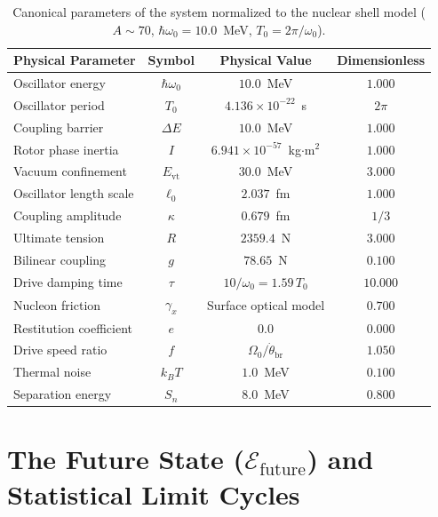 \documentclass[aps,prc,twocolumn,superscriptaddress,amsmath,amssymb,nofootinbib]{revtex4-2}
\begin{document}
\begin{table}[t]
\caption{\label{tab:params}Canonical parameters of the system normalized to the nuclear shell model (\(A \sim 70\), \(\hbar\omega_0 = 10.0\)~MeV, \(T_0 = 2\pi/\omega_0\)).}
\begin{ruledtabular}
\begin{tabular}{lccc}
Physical Parameter & Symbol & Physical Value & Dimensionless \\
\hline
Oscillator energy & \(\hbar\omega_0\) & $10.0$~MeV & $1.000$ \\
Oscillator period & \(T_0\) & \(4.136 \times 10^{-22}\)~s & \(2\pi\) \\
Coupling barrier & \(\Delta E\) & $10.0$~MeV & $1.000$ \\
Rotor phase inertia & \(I\) & \(6.941 \times 10^{-57}\)~kg\(\cdot\)m\(^2\) & $1.000$ \\
Vacuum confinement & \(E_{\text{vt}}\) & $30.0$~MeV & $3.000$ \\
Oscillator length scale & \(\ell_0\) & $2.037$~fm & $1.000$ \\
Coupling amplitude & \(\kappa\) & $0.679$~fm & \(1/3\) \\
Ultimate tension & \(R\) & $2359.4$~N & $3.000$ \\
Bilinear coupling & \(g\) & $78.65$~N & $0.100$ \\
Drive damping time & \(\tau\) & \(10/\omega_0 = 1.59\,T_0\) & $10.000$ \\
Nucleon friction & \(\gamma_x\) & Surface optical model & $0.700$ \\
Restitution coefficient & \(e\) & $0.0$ & $0.000$ \\
Drive speed ratio & \(f\) & \(\Omega_0 / \dot{\theta}_{\text{br}}\) & $1.050$ \\
Thermal noise & \(k_B T\) & $1.0$~MeV & $0.100$ \\
Separation energy & \(S_n\) & $8.0$~MeV & $0.800$ \\
\end{tabular}
\end{ruledtabular}
\end{table}

\section{The Future State (\(\mathcal{E}_{\text{future}}\)) and Statistical Limit Cycles}
\end{document}

